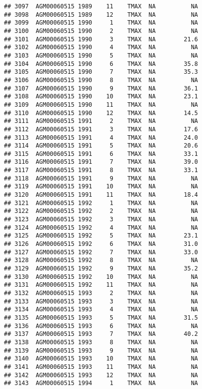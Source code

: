 \documentclass{article}\usepackage[]{graphicx}\usepackage[]{color}
\makeatletter
\newenvironment{kframe}{%
 \def\at@end@of@kframe{}%
 \ifinner\ifhmode%
  \def\at@end@of@kframe{\end{minipage}}%
  \begin{minipage}{\columnwidth}%
 \fi\fi%
 \def\FrameCommand##1{\hskip\@totalleftmargin \hskip-\fboxsep
 \colorbox{shadecolor}{##1}\hskip-\fboxsep
     \hskip-\linewidth \hskip-\@totalleftmargin \hskip\columnwidth}%
 \MakeFramed {\advance\hsize-\width
   \@totalleftmargin\z@ \linewidth\hsize
   \@setminipage}}%
 {\par\unskip\endMakeFramed%
 \at@end@of@kframe}
\newenvironment{knitrout}{}{} %
\makeatother
\begin{document}
\begin{knitrout}
\begin{kframe}
\begin{verbatim}
## 3097  AGM00060515 1989    11    TMAX  NA          NA
## 3098  AGM00060515 1989    12    TMAX  NA          NA
## 3099  AGM00060515 1990     1    TMAX  NA          NA
## 3100  AGM00060515 1990     2    TMAX  NA          NA
## 3101  AGM00060515 1990     3    TMAX  NA        21.6
## 3102  AGM00060515 1990     4    TMAX  NA          NA
## 3103  AGM00060515 1990     5    TMAX  NA          NA
## 3104  AGM00060515 1990     6    TMAX  NA        35.8
## 3105  AGM00060515 1990     7    TMAX  NA        35.3
## 3106  AGM00060515 1990     8    TMAX  NA          NA
## 3107  AGM00060515 1990     9    TMAX  NA        36.1
## 3108  AGM00060515 1990    10    TMAX  NA        23.1
## 3109  AGM00060515 1990    11    TMAX  NA          NA
## 3110  AGM00060515 1990    12    TMAX  NA        14.5
## 3111  AGM00060515 1991     2    TMAX  NA          NA
## 3112  AGM00060515 1991     3    TMAX  NA        17.6
## 3113  AGM00060515 1991     4    TMAX  NA        24.0
## 3114  AGM00060515 1991     5    TMAX  NA        20.6
## 3115  AGM00060515 1991     6    TMAX  NA        33.1
## 3116  AGM00060515 1991     7    TMAX  NA        39.0
## 3117  AGM00060515 1991     8    TMAX  NA        33.1
## 3118  AGM00060515 1991     9    TMAX  NA          NA
## 3119  AGM00060515 1991    10    TMAX  NA          NA
## 3120  AGM00060515 1991    11    TMAX  NA        18.4
## 3121  AGM00060515 1992     1    TMAX  NA          NA
## 3122  AGM00060515 1992     2    TMAX  NA          NA
## 3123  AGM00060515 1992     3    TMAX  NA          NA
## 3124  AGM00060515 1992     4    TMAX  NA          NA
## 3125  AGM00060515 1992     5    TMAX  NA        23.1
## 3126  AGM00060515 1992     6    TMAX  NA        31.0
## 3127  AGM00060515 1992     7    TMAX  NA        33.0
## 3128  AGM00060515 1992     8    TMAX  NA          NA
## 3129  AGM00060515 1992     9    TMAX  NA        35.2
## 3130  AGM00060515 1992    10    TMAX  NA          NA
## 3131  AGM00060515 1992    11    TMAX  NA          NA
## 3132  AGM00060515 1993     2    TMAX  NA          NA
## 3133  AGM00060515 1993     3    TMAX  NA          NA
## 3134  AGM00060515 1993     4    TMAX  NA          NA
## 3135  AGM00060515 1993     5    TMAX  NA        31.5
## 3136  AGM00060515 1993     6    TMAX  NA          NA
## 3137  AGM00060515 1993     7    TMAX  NA        40.2
## 3138  AGM00060515 1993     8    TMAX  NA          NA
## 3139  AGM00060515 1993     9    TMAX  NA          NA
## 3140  AGM00060515 1993    10    TMAX  NA          NA
## 3141  AGM00060515 1993    11    TMAX  NA          NA
## 3142  AGM00060515 1993    12    TMAX  NA          NA
## 3143  AGM00060515 1994     1    TMAX  NA          NA

\end{verbatim}
\end{kframe}
\end{knitrout}
\end{document}
